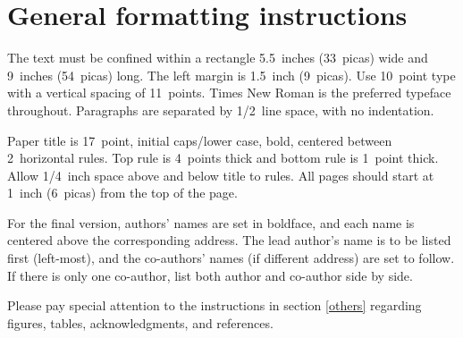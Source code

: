 \documentclass{article} %
\begin{document}



\section{General formatting instructions}
\label{gen_inst}

The text must be confined within a rectangle 5.5~inches (33~picas) wide and
9~inches (54~picas) long. The left margin is 1.5~inch (9~picas).
Use 10~point type with a vertical spacing of 11~points. Times New Roman is the
preferred typeface throughout. Paragraphs are separated by 1/2~line space,
with no indentation.

Paper title is 17~point, initial caps/lower case, bold, centered between
2~horizontal rules. Top rule is 4~points thick and bottom rule is 1~point
thick. Allow 1/4~inch space above and below title to rules. All pages should
start at 1~inch (6~picas) from the top of the page.


For the final version, authors' names are
set in boldface, and each name is centered above the corresponding
address. The lead author's name is to be listed first (left-most), and
the co-authors' names (if different address) are set to follow. If
there is only one co-author, list both author and co-author side by side.

Please pay special attention to the instructions in section \ref{others}
regarding figures, tables, acknowledgments, and references.
\end{document}
